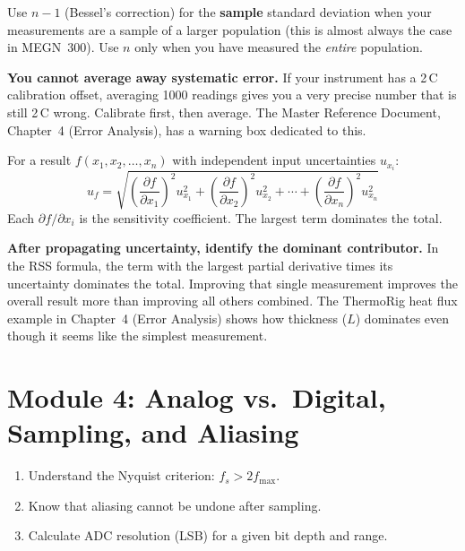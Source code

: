 \documentclass[11pt,letterpaper]{article}
\begin{document}
\begin{faqbox}
Use $n-1$ (Bessel's correction) for the \textbf{sample} standard deviation when your measurements are a sample of a larger population (this is almost always the case in MEGN~300). Use $n$ only when you have measured the \emph{entire} population.
\end{faqbox}

\begin{warnbox}
\textbf{You cannot average away systematic error.} If your instrument has a 2\,\textdegree{}C calibration offset, averaging 1000 readings gives you a very precise number that is still 2\,\textdegree{}C wrong. Calibrate first, then average. The Master Reference Document, Chapter~4 (Error Analysis), has a warning box dedicated to this.
\end{warnbox}

\begin{faqbox}
For a result $f(x_1, x_2, \ldots, x_n)$ with independent input uncertainties $u_{x_i}$:
\[
u_f = \sqrt{\left(\frac{\partial f}{\partial x_1}\right)^2 u_{x_1}^2 + \left(\frac{\partial f}{\partial x_2}\right)^2 u_{x_2}^2 + \cdots + \left(\frac{\partial f}{\partial x_n}\right)^2 u_{x_n}^2}
\]
Each $\partial f / \partial x_i$ is the sensitivity coefficient. The largest term dominates the total.
\end{faqbox}

\begin{protip}
\textbf{After propagating uncertainty, identify the dominant contributor.} In the RSS formula, the term with the largest partial derivative times its uncertainty dominates the total. Improving that single measurement improves the overall result more than improving all others combined. The ThermoRig heat flux example in Chapter~4 (Error Analysis) shows how thickness ($L$) dominates even though it seems like the simplest measurement.
\end{protip}

\section{Module 4: Analog vs.\ Digital, Sampling, and Aliasing}

\begin{priorities}
\begin{enumerate}[leftmargin=*, itemsep=1pt, topsep=0pt]
    \item Understand the Nyquist criterion: $f_s > 2 f_{\max}$.
    \item Know that aliasing cannot be undone after sampling.
    \item Calculate ADC resolution (LSB) for a given bit depth and range.
\end{enumerate}
\end{priorities}
\end{document}
